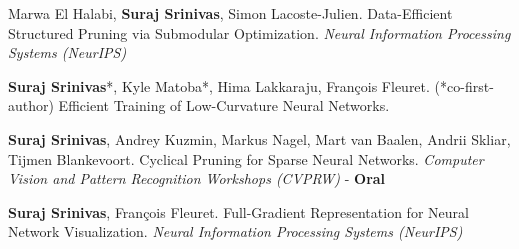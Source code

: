 \documentclass[11pt, a4paper, english]{moderncv}        %
\begin{document}
 {Marwa El Halabi, \textbf{Suraj Srinivas}, Simon Lacoste-Julien.
\newline Data-Efficient Structured Pruning via Submodular Optimization. \newline \textit{Neural Information Processing Systems (NeurIPS)}}

\vspace*{0.25em}
 {\textbf{Suraj Srinivas}*, Kyle Matoba*, Hima Lakkaraju, Fran\c{c}ois Fleuret. (*co-first-author) \newline Efficient Training of Low-Curvature Neural Networks. 
}

\vspace*{0.25em}
 {\textbf{Suraj Srinivas}, Andrey Kuzmin, Markus Nagel, Mart van Baalen, \newline Andrii Skliar, Tijmen Blankevoort. \newline Cyclical Pruning for Sparse Neural Networks. 
\newline \textit{Computer Vision and Pattern Recognition Workshops (CVPRW)} - \textbf{Oral}}

\vspace*{0.25em}

\vspace*{0.25em}

 {\textbf{Suraj Srinivas}, Fran\c{c}ois Fleuret. \newline Full-Gradient Representation
for Neural Network Visualization. \newline \textit{Neural Information Processing Systems (NeurIPS)}
}

\vspace*{0.25em}


\vspace*{0.25em}
\end{document}
